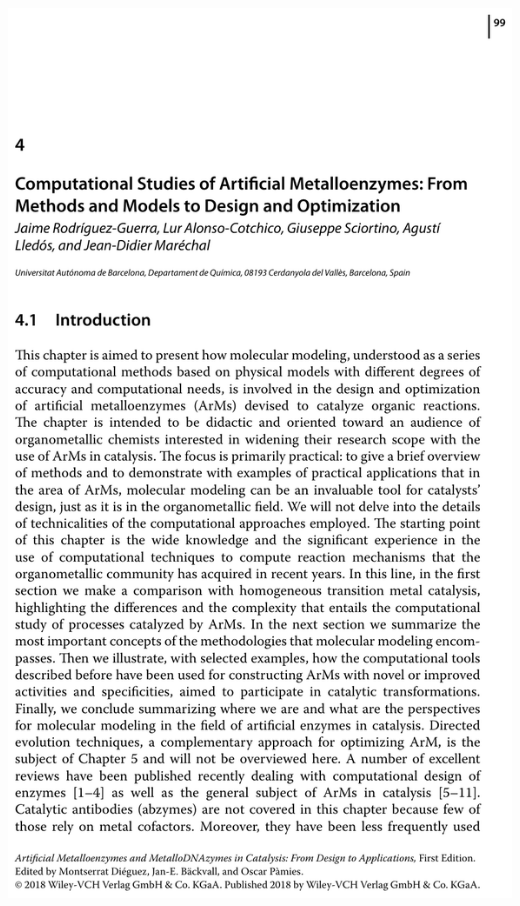 \clearpage\thispagestyle{empty}\mbox{}\clearpage
\includegraphics[height=\textheight]{figures/pubs/wiley-chapter.pdf}
\clearpage\thispagestyle{empty}\mbox{}\clearpage
